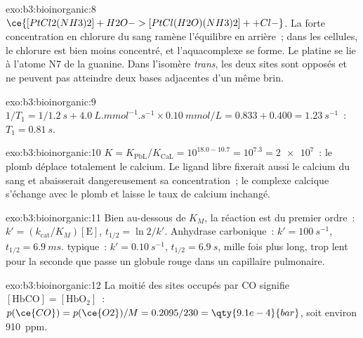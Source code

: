 \begin{solution}{exo:b3:bioinorganic:8}
$\ce{[PtCl2(NH3)2] + H2O -> [PtCl(H2O)(NH3)2]+ + Cl-}$. La forte concentration en chlorure du sang
ramène l'équilibre en arrière~; dans les cellules, le chlorure est bien
moins concentré, et l'aquacomplexe se forme. Le platine se lie à l'atome N7
de la guanine. Dans l'isomère \textit{trans}, les deux sites  sont
opposés et ne peuvent pas atteindre deux bases adjacentes d'un même brin.
\end{solution}

\begin{solution}{exo:b3:bioinorganic:9}
$1/T_1 = 1/\qty{1.2}{s} + \qty{4.0}{L.mmol^{-1}.s^{-1}} \times \qty{0.10}{mmol/L} = 0.833 + 0.400 = \qty{1.23}{s^{-1}}$~: $T_1 = \qty{0.81}{s}$.
\end{solution}

\begin{solution}{exo:b3:bioinorganic:10}
$K = K_{\mathrm{PbL}}/K_{\mathrm{CaL}} = 10^{18.0 - 10.7} = 10^{7.3} = \num{2e7}$~: le plomb déplace totalement le calcium. Le ligand
libre fixerait aussi le calcium du sang et abaisserait dangereusement sa
concentration~; le complexe calcique s'échange avec le plomb et laisse le
taux de calcium inchangé.
\end{solution}

\begin{solution}{exo:b3:bioinorganic:11}
Bien au-dessous de $K_M$, la réaction est du premier ordre~: $k' = (k_{\mathrm{cat}}/K_M)[\mathrm E]$, $t_{1/2} = \ln 2/k'$. Anhydrase
carbonique~: $k' = \qty{100}{s^{-1}}$, $t_{1/2} = \qty{6.9}{ms}$.  typique~: $k' = \qty{0.10}{s^{-1}}$, $t_{1/2} = \qty{6.9}{s}$, mille
fois plus long, trop lent pour la seconde que passe un globule rouge dans
un capillaire pulmonaire.
\end{solution}

\begin{solution}{exo:b3:bioinorganic:12}
La moitié des sites occupés par CO signifie $[\mathrm{HbCO}] = [\mathrm{HbO_2}]$~: $p(\ce{CO}) = p(\ce{O2})/M = 0.2095/230 = \qty{9.1e-4}{bar}$, soit environ
\qty{910}{ppm}.
\end{solution}

